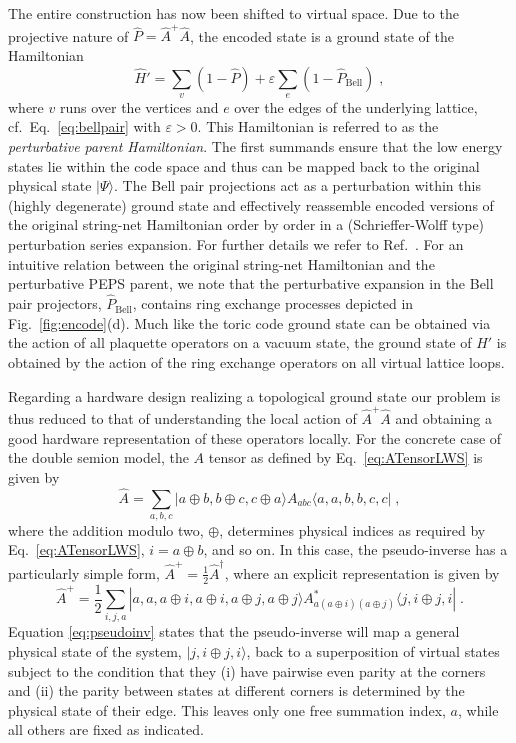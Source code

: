\documentclass[twocolumn,floats,prx,showpacs]{revtex4-1}
\newcommand{\ket}[1]{|#1\rangle}
\newcommand{\bra}[1]{\langle#1|}
\begin{document}
The entire construction has now been shifted to virtual space. Due to the projective nature of $\hat P=\hat A^+ \hat A$, the encoded state is a ground state of the Hamiltonian
\begin{equation}
\hat H'=\sum_v (1-\hat P) + \varepsilon \sum_e (1-\hat P_\mathrm{Bell}) \label{eq:H} \;,
\end{equation}
where  $v$ runs over the vertices and $e$ over the edges of the underlying lattice, cf.~Eq.~\eqref{eq:bellpair} with $\varepsilon>0$. This Hamiltonian is referred to as the \emph{perturbative parent Hamiltonian}. The first summands ensure that the low energy states lie within the code space and thus can be mapped back to the original physical state $\ket{\Psi}$. The Bell pair projections act as a perturbation within this (highly degenerate) ground state and effectively reassemble encoded versions of the original string-net Hamiltonian order by order in a (Schrieffer-Wolff type) perturbation series expansion. For further details we refer to Ref.~\cite{Brell2014PEPS}. For an intuitive relation between the original string-net Hamiltonian and the perturbative PEPS parent, we note that the perturbative expansion in the Bell pair projectors, $\hat P_\mathrm{Bell}$, contains  ring exchange processes depicted in Fig.~\ref{fig:encode}(d). Much like the toric code ground state can be obtained via the action of all plaquette operators on a vacuum state, the ground state of $\hat H'$ is obtained by the action of the ring exchange operators on all virtual lattice loops.

Regarding a hardware design realizing a topological ground state our problem is thus reduced to that of understanding the local action of $\hat A^+ \hat A$ and obtaining a good hardware representation of these operators locally. For the concrete case of the double semion model, the $A$ tensor as defined by Eq.~\eqref{eq:ATensorLWS} is given by
\begin{equation}
\hat A = \sum_{a,b,c} \ket{a \oplus  b, b \oplus  c, c \oplus  a} A_{abc} \bra{a,a,b,b,c,c}\;,
\end{equation}
where the addition modulo two, $\oplus$, determines physical indices as required by Eq.~\eqref{eq:ATensorLWS}, $i=a\oplus b$, and so on. 
In this case, the pseudo-inverse has a particularly simple form, $\hat A^+=\frac12 \hat A^\dagger$, where an explicit representation is given by
 \begin{equation}\label{eq:pseudoinv}
\hat A^+= \frac{1}{2}\sum_{i,j,a} \ket{a, a, a \oplus i , a \oplus i, a \oplus j, a \oplus j } A^\ast_{a(a\oplus i)(a\oplus j)} \bra{j,i\oplus j,i} \;.
\end{equation}
Equation  \eqref{eq:pseudoinv} 
 states that the pseudo-inverse will map a general physical state of the system, $\ket{j,i\oplus j,i}$, back to a superposition of virtual states subject to the condition that they (i) have pairwise even parity at the corners and (ii) the parity between states at different corners is determined by the physical state of their edge. This leaves  only one free summation index, $a$, while all others are fixed as indicated. 
\end{document}

